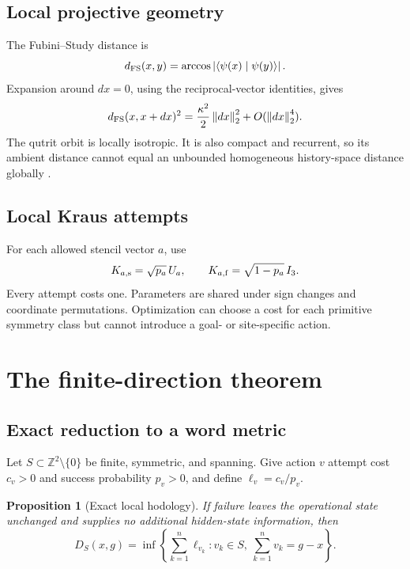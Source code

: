 \documentclass[11pt]{article}
\newtheorem{proposition}[theorem]{Proposition}
\theoremstyle{definition}\newtheorem{definition}[theorem]{Definition}
\theoremstyle{remark}\newtheorem{remark}[theorem]{Remark}
\newcommand{\Z}{\mathbb Z}
\newcommand{\braket}[2]{\langle #1\mid #2\rangle}
\newcommand{\norm}[1]{\left\lVert #1\right\rVert}
\newcommand{\abs}[1]{\left\lvert #1\right\rvert}
\begin{document}
\subsection{Local projective geometry}

The Fubini--Study distance is
\[
d_{\rm FS}(x,y)=\arccos\abs{\braket{\psi(x)}{\psi(y)}}.
\]
Expansion around \(dx=0\), using the reciprocal-vector identities, gives
\begin{equation}
d_{\rm FS}(x,x+dx)^2=\frac{\kappa^2}{2}\norm{dx}_2^2
+O(\norm{dx}_2^4).
\label{eq:fs-local}
\end{equation}
The qutrit orbit is locally isotropic. It is also compact and recurrent, so
its ambient distance cannot equal an unbounded homogeneous history-space
distance globally \cite{bengtsson2017}.

\subsection{Local Kraus attempts}

For each allowed stencil vector \(a\), use
\begin{equation}
K_{a,\rm s}=\sqrt{p_a}\,U_a,\qquad
K_{a,\rm f}=\sqrt{1-p_a}\,I_3.
\label{eq:local-kraus}
\end{equation}
Every attempt costs one. Parameters are shared under sign changes and
coordinate permutations. Optimization can choose a cost for each primitive
symmetry class but cannot introduce a goal- or site-specific action.

\section{The finite-direction theorem}
\label{sec:theory}

\subsection{Exact reduction to a word metric}

Let \(S\subset\Z^2\setminus\{0\}\) be finite, symmetric, and spanning. Give
action \(v\) attempt cost \(c_v>0\) and success probability \(p_v>0\), and
define \(\ell_v=c_v/p_v\).

\begin{proposition}[Exact local hodology]
\label{prop:word}
If failure leaves the operational state unchanged and supplies no additional
hidden-state information, then
\begin{equation}
D_S(x,g)=\inf\left\{\sum_{k=1}^n\ell_{v_k}:
v_k\in S,\ \sum_{k=1}^nv_k=g-x\right\}.
\label{eq:word}
\end{equation}
\end{proposition}
\end{document}
